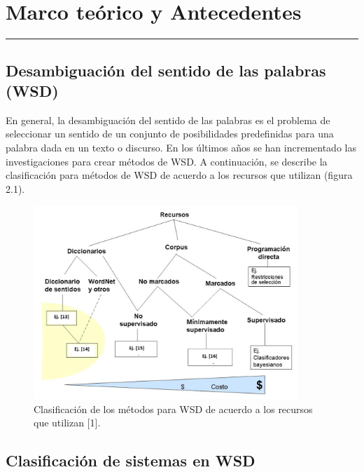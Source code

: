 \chapter{Marco teórico y Antecedentes }
\hrule \bigskip \vspace*{1cm}

\section{Desambiguación del sentido de las palabras (WSD)}
En general, la desambiguación del sentido de las palabras es el problema de seleccionar un sentido de un conjunto de posibilidades predefinidas para una palabra dada en un texto o discurso. 
En los últimos años se han incrementado las investigaciones para crear métodos de WSD. A continuación, se describe la clasificación para métodos de WSD de acuerdo a los recursos que utilizan (figura 2.1).

  \begin{figure}[h!]
	  \begin{center}
    \includegraphics[angle=0, width=10cm]{Graficos/desambiguacion_WSD}
	  \caption{Clasificación de los métodos para WSD de acuerdo a los recursos que utilizan [1].}
    \end{center}
	\end{figure}

\section{Clasificación de sistemas en WSD}
